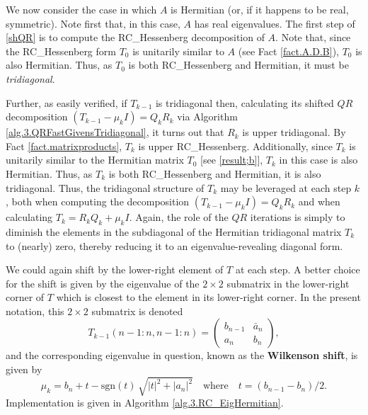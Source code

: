 
\noindent We now consider the case in which $A$ is Hermitian (or, if it happens to be real, symmetric).  Note first that, in this case, $A$ has
real eigenvalues.  The first step of \eqref{shQR} is to compute the RC_Hessenberg decomposition of $A$.
Note that, since the RC_Hessenberg form $T_0$ is unitarily similar to $A$ (see Fact \ref{fact.A.D.B}), $T_0$ is also Hermitian.
Thus, as $T_0$ is both RC_Hessenberg and Hermitian, it must be {\it tridiagonal}.

Further, as easily verified, if $T_{k-1}$ is tridiagonal then, calculating its shifted $QR$ decomposition $(T_{k-1}-\mu_k I)={Q}_{k} {R}_{k}$
via Algorithm \ref{alg.3.QRFastGivensTridiagonal}, it turns out that ${R}_{k}$ is upper tridiagonal.
By Fact \ref{fact.matrixproducts}, $T_k$ is upper RC_Hessenberg.
Additionally, since $T_k$ is unitarily similar to the Hermitian matrix $T_0$ [see \eqref{result;b}],
$T_{k}$ in this case is also Hermitian.  Thus, as $T_{k}$ is both RC_Hessenberg and Hermitian, it is also tridiagonal.
Thus, the tridiagonal structure of $T_{k}$ may be leveraged at each step $k$, both when computing the
decomposition $(T_{k-1}-\mu_k I)={Q}_{k} {R}_{k}$ and when calculating $T_{k} = {R}_{k} {Q}_{k} + \mu_k I$.  Again,
the role of the $QR$ iterations is simply to diminish the elements in the subdiagonal of the Hermitian tridiagonal matrix
$T_{k}$ to (nearly) zero, thereby reducing it to an eigenvalue-revealing diagonal form.

We could again shift by the lower-right element of $T$ at each step.  A better choice for the shift is given by the eigenvalue of the $2\times 2$ submatrix in the
lower-right corner of $T$ which is closest to the element in its lower-right corner.  In the present notation, this $2\times 2$ submatrix is denoted
\begin{equation*}
  T_{k-1}(n-1:n,n-1:n) = \begin{pmatrix} b_{n-1} & \bar a_{n} \\ a_{n} & b_n \end{pmatrix},
\end{equation*}
and the corresponding eigenvalue in question, known as the {\bf Wilkenson shift}, is given by
\begin{equation}
  \mu_k = b_n + t - \textrm{sgn}(t)\,\sqrt{|t|^2 + |a_n|^2} \quad \textrm{where} \quad t=(b_{n-1}-b_n)/2.
\end{equation}
Implementation is given in Algorithm \ref{alg.3.RC_EigHermitian}.
\clearpage

